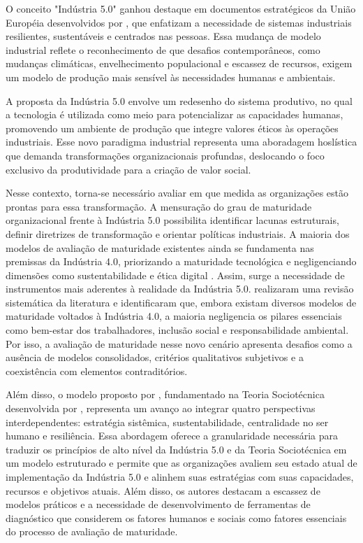 O conceito "Indústria 5.0" ganhou destaque em documentos estratégicos da União Européia desenvolvidos por , que enfatizam a necessidade de sistemas industriais resilientes, sustentáveis e centrados nas pessoas.
Essa mudança de modelo industrial reflete o reconhecimento de que desafios contemporâneos, como mudanças climáticas, envelhecimento populacional e escassez de recursos, exigem um modelo de produção mais sensível às necessidades humanas e ambientais.

A proposta da Indústria 5.0 envolve um redesenho do sistema produtivo, no qual a tecnologia é utilizada como meio para potencializar as capacidades humanas, promovendo um ambiente de produção que integre valores éticos às operações industriais.
Esse novo paradigma industrial representa uma aboradagem hoslística que demanda transformações organizacionais profundas, deslocando o foco exclusivo da produtividade para a criação de valor social. %

Nesse contexto, torna-se necessário avaliar em que medida as organizações estão prontas para essa transformação.
A mensuração do grau de maturidade organizacional frente à Indústria 5.0 possibilita identificar lacunas estruturais, definir diretrizes de transformação e orientar políticas industriais.
A maioria dos modelos de avaliação de maturidade existentes ainda se fundamenta nas premissas da Indústria 4.0, priorizando a maturidade tecnológica e negligenciando dimensões como sustentabilidade e ética digital \cite{Lucato2019,HeinPensel2023}.
Assim, surge a necessidade de instrumentos mais aderentes à realidade da Indústria 5.0.
 realizaram uma revisão sistemática da literatura e identificaram que, embora existam diversos modelos de maturidade voltados à Indústria 4.0, a maioria negligencia os pilares essenciais como bem-estar dos trabalhadores, inclusão social e responsabilidade ambiental.
Por isso, a avaliação de maturidade nesse novo cenário apresenta desafios como a ausência de modelos consolidados, critérios qualitativos subjetivos e a coexistência com elementos contraditórios.

Além disso, o modelo proposto por , fundamentado na Teoria Sociotécnica desenvolvida por , representa um avanço ao integrar quatro perspectivas interdependentes: estratégia sistêmica, sustentabilidade, centralidade no ser humano e resiliência.
Essa abordagem oferece a granularidade necessária para traduzir os princípios de alto nível da Indústria 5.0 e da Teoria Sociotécnica em um modelo estruturado e permite que as organizações avaliem seu estado atual de implementação da Indústria 5.0 e alinhem suas estratégias com suas capacidades, recursos e objetivos atuais.
Além disso, os autores destacam a escassez de modelos práticos e a necessidade de desenvolvimento de ferramentas de diagnóstico que considerem os fatores humanos e sociais como fatores essenciais do processo de avaliação de maturidade.

